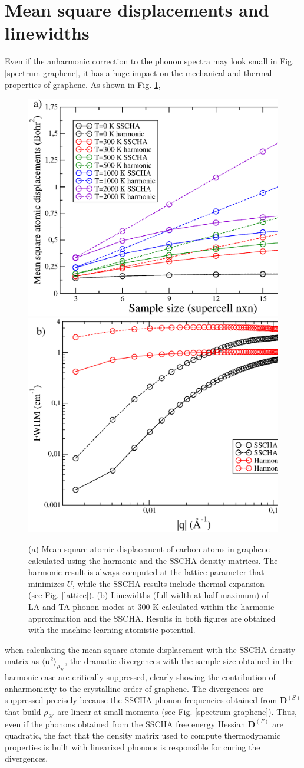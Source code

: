 \section{Mean square displacements and linewidths}

Even if the anharmonic correction to the phonon spectra may look small in Fig. \ref{spectrum-graphene}, it has a 
huge impact on the mechanical and thermal properties of graphene. As shown in Fig. \ref{problems}, 
\begin{figure}[ht]
\includegraphics[width=0.49\linewidth]{Figures/rms.eps}
\includegraphics[width=0.49\linewidth]{Figures/lw-graphene.eps}
\caption[SSCHA mean square atomic displacements and linewidths]{(a) Mean square atomic displacement of carbon atoms 
	in graphene calculated using the harmonic and the SSCHA density matrices. The harmonic result is always 
	computed at the lattice parameter that minimizes $U$, while the SSCHA results include thermal expansion (see 
	Fig. \ref{lattice}). (b) Linewidths (full width at half maximum) of LA and TA phonon modes at $300$ K 
	calculated within the harmonic approximation and the SSCHA. Results in both figures are obtained with the 
	machine learning atomistic potential.}
\label{problems}
\end{figure}
when calculating the mean square atomic displacement with the SSCHA density matrix as 
$\langle \mathbf{u}^2 \rangle_{\rho_{\mathcal{H}}}$, the dramatic divergences with the sample size obtained in the 
harmonic case are critically suppressed, clearly showing the contribution of anharmonicity to the crystalline order 
of graphene. The divergences are suppressed precisely because the SSCHA phonon frequencies obtained from 
$\boldsymbol{D}^{(S)}$ that build $\rho_{\mathcal{H}}$ are linear at small momenta (see 
Fig. \ref{spectrum-graphene}). Thus, even if the phonons obtained from the SSCHA free energy Hessian 
$\boldsymbol{D}^{(F)}$ are quadratic, the fact that the density matrix used to compute thermodynamic properties is 
built with linearized phonons is responsible for curing the divergences. \\

